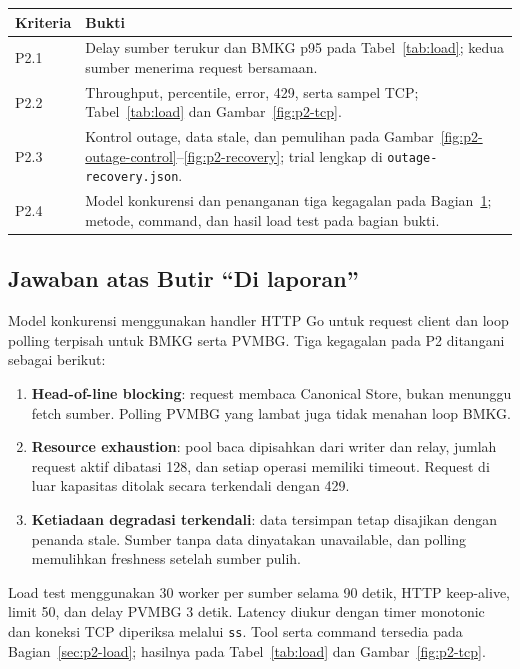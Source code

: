 \begin{table}[H]
\centering\small
\begin{tabularx}{\textwidth}{>{\raggedright\arraybackslash}p{2cm}Y}
\toprule
Kriteria & Bukti \\
\midrule
P2.1 & Delay sumber terukur dan BMKG p95 pada Tabel~\ref{tab:load}; kedua sumber menerima request bersamaan. \\
P2.2 & Throughput, percentile, error, 429, serta sampel TCP; Tabel~\ref{tab:load} dan Gambar~\ref{fig:p2-tcp}. \\
P2.3 & Kontrol outage, data stale, dan pemulihan pada Gambar~\ref{fig:p2-outage-control}--\ref{fig:p2-recovery}; trial lengkap di \texttt{outage-recovery.json}. \\
P2.4 & Model konkurensi dan penanganan tiga kegagalan pada Bagian~\ref{sec:p2-di-laporan}; metode, command, dan hasil load test pada bagian bukti. \\
\bottomrule
\end{tabularx}
\end{table}

\begin{samepage}
\section{Jawaban atas Butir ``Di laporan''}
\label{sec:p2-di-laporan}
Model konkurensi menggunakan handler HTTP Go untuk request client dan loop polling terpisah untuk BMKG serta PVMBG. Tiga kegagalan pada P2 ditangani sebagai berikut:
\begin{enumerate}
\item \textbf{Head-of-line blocking}: request membaca Canonical Store, bukan menunggu fetch sumber. Polling PVMBG yang lambat juga tidak menahan loop BMKG.
\item \textbf{Resource exhaustion}: pool baca dipisahkan dari writer dan relay, jumlah request aktif dibatasi 128, dan setiap operasi memiliki timeout. Request di luar kapasitas ditolak secara terkendali dengan 429.
\item \textbf{Ketiadaan degradasi terkendali}: data tersimpan tetap disajikan dengan penanda stale. Sumber tanpa data dinyatakan unavailable, dan polling memulihkan freshness setelah sumber pulih.
\end{enumerate}

Load test menggunakan 30 worker per sumber selama 90 detik, HTTP keep-alive, limit 50, dan delay PVMBG 3 detik. Latency diukur dengan timer monotonic dan koneksi TCP diperiksa melalui \texttt{ss}. Tool serta command tersedia pada Bagian~\ref{sec:p2-load}; hasilnya pada Tabel~\ref{tab:load} dan Gambar~\ref{fig:p2-tcp}.
\end{samepage}
